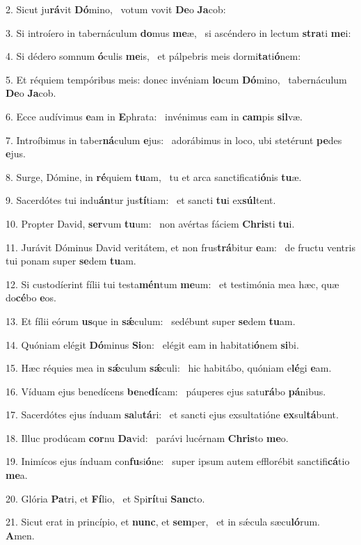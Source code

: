 2. Sicut ju\textbf{rá}vit \textbf{Dó}mino, \ast\  votum vovit \textbf{De}o \textbf{Ja}cob:\

3. Si introíero in tabernáculum \textbf{do}mus \textbf{me}æ, \ast\  si ascéndero in lectum \textbf{stra}ti \textbf{me}i:\

4. Si dédero somnum \textbf{ó}culis \textbf{me}is, \ast\  et pálpebris meis dormi\textbf{ta}ti\textbf{ó}nem:\

5. Et réquiem tempóribus meis: donec invéniam \textbf{lo}cum \textbf{Dó}mino, \ast\  tabernáculum \textbf{De}o \textbf{Ja}cob.\

6. Ecce audívimus \textbf{e}am in \textbf{E}phrata: \ast\  invénimus eam in \textbf{cam}pis \textbf{sil}væ.\

7. Introíbimus in taber\textbf{ná}culum \textbf{e}jus: \ast\  adorábimus in loco, ubi stetérunt \textbf{pe}des \textbf{e}jus.\

8. Surge, Dómine, in \textbf{ré}quiem \textbf{tu}am, \ast\  tu et arca sanctificati\textbf{ó}nis \textbf{tu}æ.\

9. Sacerdótes tui indu\textbf{án}tur jus\textbf{tí}tiam: \ast\  et sancti \textbf{tu}i ex\textbf{súl}tent.\

10. Propter David, \textbf{ser}vum \textbf{tu}um: \ast\  non avértas fáciem \textbf{Chris}ti \textbf{tu}i.\

11. Jurávit Dóminus David veritátem, et non frus\textbf{trá}bitur \textbf{e}am: \ast\  de fructu ventris tui ponam super \textbf{se}dem \textbf{tu}am.\

12. Si custodíerint fílii tui testa\textbf{mén}tum \textbf{me}um: \ast\  et testimónia mea hæc, quæ do\textbf{cé}bo \textbf{e}os.\

13. Et fílii eórum \textbf{us}que in \textbf{sǽ}culum: \ast\  sedébunt super \textbf{se}dem \textbf{tu}am.\

14. Quóniam elégit \textbf{Dó}minus \textbf{Si}on: \ast\  elégit eam in habitati\textbf{ó}nem \textbf{si}bi.\

15. Hæc réquies mea in \textbf{sǽ}culum \textbf{sǽ}culi: \ast\  hic habitábo, quóniam e\textbf{lé}gi \textbf{e}am.\

16. Víduam ejus benedícens \textbf{be}ne\textbf{dí}cam: \ast\  páuperes ejus satu\textbf{rá}bo \textbf{pá}nibus.\

17. Sacerdótes ejus índuam \textbf{sa}lu\textbf{tá}ri: \ast\  et sancti ejus exsultatióne \textbf{ex}sul\textbf{tá}bunt.\

18. Illuc prodúcam \textbf{cor}nu \textbf{Da}vid: \ast\  parávi lucérnam \textbf{Chris}to \textbf{me}o.\

19. Inimícos ejus índuam con\textbf{fu}si\textbf{ó}ne: \ast\  super ipsum autem efflorébit sanctifi\textbf{cá}tio \textbf{me}a.\

20. Glória \textbf{Pa}tri, et \textbf{Fí}lio, \ast\  et Spi\textbf{rí}tui \textbf{Sanc}to.\

21. Sicut erat in princípio, et \textbf{nunc}, et \textbf{sem}per, \ast\  et in sǽcula sæcu\textbf{ló}rum. \textbf{A}men.\

